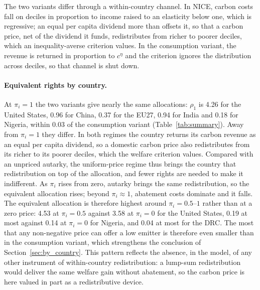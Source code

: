 \documentclass[12pt,english]{article}
\theoremstyle{remark}
\begin{document}
The two variants differ through a within-country channel. In NICE, carbon costs fall on deciles in proportion to income raised to an elasticity below one, which is regressive; an equal per capita dividend more than offsets it, so that a carbon price, net of the dividend it funds, redistributes from richer to poorer deciles, which an inequality-averse criterion values. In the consumption variant, the revenue is returned in proportion to $c^{\eta}$ and the criterion ignores the distribution across deciles, so that channel is shut down.

\paragraph{Equivalent rights by country.} At $\pi_i=1$ the two variants give nearly the same allocations: $\rho_1$ is 4.26 for the United States, 0.96 for China, 0.37 for the EU27, 0.94 for India and 0.18 for Nigeria, within 0.03 of the consumption variant (Table~\ref{tab:summary}). Away from $\pi_i=1$ they differ. In both regimes the country returns its carbon revenue as an equal per capita dividend, so a domestic carbon price also redistributes from its richer to its poorer deciles, which the welfare criterion values. Compared with an unpriced autarky, the uniform-price regime thus brings the country that redistribution on top of the allocation, and fewer rights are needed to make it indifferent. As $\pi_i$ rises from zero, autarky brings the same redistribution, so the equivalent allocation rises; beyond $\pi_i\approx1$, abatement costs dominate and it falls. The equivalent allocation is therefore highest around $\pi_i=0.5$--$1$ rather than at a zero price: 4.53 at $\pi_i=0.5$ against 3.58 at $\pi_i=0$ for the United States, 0.19 at most against 0.14 at $\pi_i=0$ for Nigeria, and 0.04 at most for the DRC. The most that any non-negative price can offer a low emitter is therefore even smaller than in the consumption variant, which strengthens the conclusion of Section~\ref{sec:by_country}. This pattern reflects the absence, in the model, of any other instrument of within-country redistribution: a lump-sum redistribution would deliver the same welfare gain without abatement, so the carbon price is here valued in part as a redistributive device. %
\end{document}
